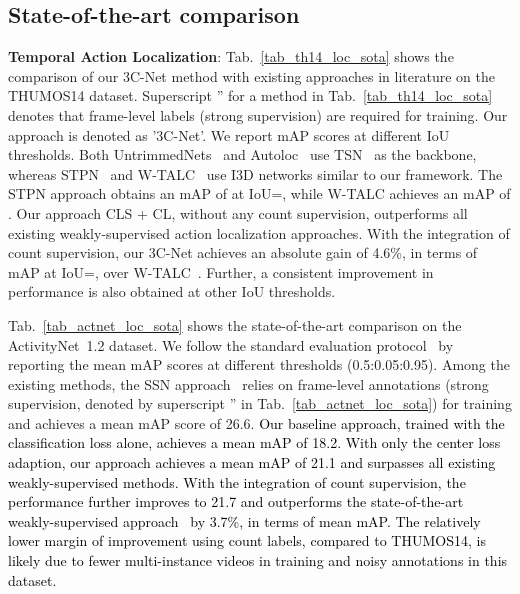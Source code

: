 \documentclass[10pt,twocolumn,letterpaper]{article}
\begin{document}
\subsection{State-of-the-art comparison\label{sec_exp_results}}
\noindent\textbf{Temporal Action Localization}: 
Tab.~\ref{tab_th14_loc_sota} shows the comparison of our 3C-Net method with existing approaches in literature on the THUMOS14 dataset. Superscript '' for a method in Tab.~\ref{tab_th14_loc_sota} denotes that frame-level labels (strong supervision) are required for training. Our approach is denoted as '3C-Net'. We report mAP scores at different IoU thresholds. Both UntrimmedNets~\cite{untrimnets} and Autoloc~\cite{autoloc} use TSN~\cite{tsn} as the backbone, whereas STPN~\cite{stpn} and W-TALC~\cite{wtalc} use I3D networks similar to our framework. The STPN approach obtains an mAP of  at IoU=, while W-TALC achieves an mAP of . 
Our approach CLS + CL, without any count supervision, outperforms all existing weakly-supervised action localization approaches. With the integration of count supervision, our 
3C-Net achieves an absolute gain of 4.6\%, in terms of mAP at IoU=, over W-TALC~\cite{wtalc}. Further, a consistent improvement in performance is also obtained at other IoU thresholds. 



Tab.~\ref{tab_actnet_loc_sota} shows the state-of-the-art comparison on the ActivityNet~1.2 dataset. We follow the standard evaluation protocol~\cite{activitynet} by reporting the mean mAP scores at different thresholds (0.5:0.05:0.95). 
Among the existing methods, the SSN approach~\cite{ssn} relies on frame-level annotations (strong supervision, denoted by superscript '' in Tab.~\ref{tab_actnet_loc_sota}) for training and achieves a mean mAP score of 26.6.
\textcolor{black}{Our baseline approach, trained with the classification loss alone, achieves a mean mAP of 18.2. With only the center loss adaption, our approach achieves a mean mAP of 21.1 and surpasses all existing weakly-supervised methods. With the integration of count supervision, the performance further improves to 21.7 and outperforms the state-of-the-art weakly-supervised approach~\cite{wtalc} by 3.7\%, in terms of mean mAP. The relatively lower margin of improvement using count labels, compared to THUMOS14, is likely due to fewer multi-instance videos in training and noisy annotations in this dataset.}
\end{document}
